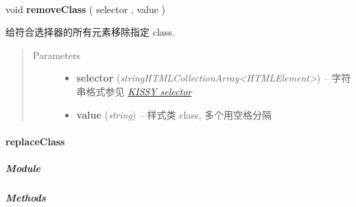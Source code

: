\documentclass[letterpaper,10pt,english]{sphinxmanual}
\begin{document}
\begin{fulllineitems}
\label{api/core/dom/removeClass:DOM.removeClass}~
\begin{DUlineblock}{0em}
\item[] void \textbf{removeClass} ( selector , value )
\item[] 给符合选择器的所有元素移除指定 class.
\end{DUlineblock}
\begin{quote}\begin{description}
\item[{Parameters}] \leavevmode\begin{itemize}
\item {}
\textbf{selector} (\emph{string\textbar{}HTMLCollection\textbar{}Array\textless{}HTMLElement\textgreater{}}) -- 字符串格式参见 {\hyperref[api/core/dom/selector:dom-selector]{\emph{KISSY selector}}}

\item {}
\textbf{value} (\emph{string}) -- 样式类 class, 多个用空格分隔

\end{itemize}

\end{description}\end{quote}

\end{fulllineitems}



\paragraph{replaceClass}
\label{api/core/dom/replaceClass:replaceclass}\label{api/core/dom/replaceClass::doc}

\subparagraph{Module}
\label{api/core/dom/replaceClass:module}\begin{quote}

{\hyperref[api/core/dom/index:module-DOM]{}}
\end{quote}


\subparagraph{Methods}
\label{api/core/dom/replaceClass:methods}
\end{document}
